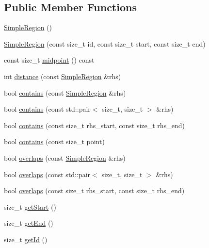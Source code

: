 \subsection*{Public Member Functions}
\begin{DoxyCompactItemize}
\item 
\hyperlink{classSimpleRegion_a3f3502f62398e26fb88ea7b90ff7d3b8}{Simple\+Region} ()
\item 
\hyperlink{classSimpleRegion_a5432bba56f93741e76de989ccde3ecd5}{Simple\+Region} (const size\+\_\+t id, const size\+\_\+t start, const size\+\_\+t end)
\item 
const size\+\_\+t \hyperlink{classSimpleRegion_a3175b332ee5cbe1d6c83986666c481d0}{midpoint} () const 
\item 
int \hyperlink{classSimpleRegion_ab3e6068e293f2b8f0da920d8feb1f12b}{distance} (const \hyperlink{classSimpleRegion}{Simple\+Region} \&rhs)
\item 
bool \hyperlink{classSimpleRegion_aa0f04be989b3fd8726b60ea8af05408e}{contains} (const \hyperlink{classSimpleRegion}{Simple\+Region} \&rhs)
\item 
bool \hyperlink{classSimpleRegion_a71f1e66b268298559e319a39125b20e1}{contains} (const std\+::pair$<$ size\+\_\+t, size\+\_\+t $>$ \&rhs)
\item 
bool \hyperlink{classSimpleRegion_aedbd4cac0fc5318e612af3db76f19541}{contains} (const size\+\_\+t rhs\+\_\+start, const size\+\_\+t rhs\+\_\+end)
\item 
bool \hyperlink{classSimpleRegion_a39b10cf9d7ba8073da42e2cb95072bff}{contains} (const size\+\_\+t point)
\item 
bool \hyperlink{classSimpleRegion_a1f98da632e768077c967d63819cefedd}{overlaps} (const \hyperlink{classSimpleRegion}{Simple\+Region} \&rhs)
\item 
bool \hyperlink{classSimpleRegion_a0caf8d9707b7b0b29555e8bafd32ed47}{overlaps} (const std\+::pair$<$ size\+\_\+t, size\+\_\+t $>$ \&rhs)
\item 
bool \hyperlink{classSimpleRegion_a087f24f509cc26164a99e8509b720b28}{overlaps} (const size\+\_\+t rhs\+\_\+start, const size\+\_\+t rhs\+\_\+end)
\item 
size\+\_\+t \hyperlink{classSimpleRegion_a7c0d4f68409075dba1de716a328e9079}{get\+Start} ()
\item 
size\+\_\+t \hyperlink{classSimpleRegion_afb4924be3627dedec850a3ada174b083}{get\+End} ()
\item 
size\+\_\+t \hyperlink{classSimpleRegion_a1014d259fc8c94088b866be2d57835bc}{get\+Id} ()
\end{DoxyCompactItemize}
